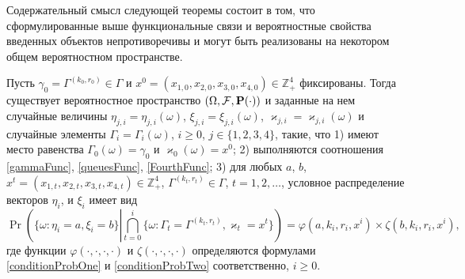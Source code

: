 \documentclass[a4paper,12pt,russian]{extarticle}
\begin{document}
Содержательный смысл следующей теоремы состоит в том, что сформулированные выше функциональные связи и вероятностные свойства введенных объектов непротиворечивы и могут быть реализованы на некотором общем вероятностном пространстве.
\begin{theorem}
Пусть $\gamma_0=\Gamma^{(k_0,r_0)}\in \Gamma$ и $x^0=(x_{1,0},x_{2,0}, x_{3,0},x_{4,0})\in \mathbb{Z}_+^4$ фиксированы.
Тогда существует вероятностное пространство $(\Omega, {\cal F}, \Pr(\cdot))$ и заданные на нем случайные величины $\eta_{j,i}=\eta_{j,i}(\omega)$, $\xi_{j,i}=\xi_{j,i}(\omega)$, 	 $\varkappa_{j,i}=\varkappa_{j,i}(\omega)$ и случайные элементы $\Gamma_i=\Gamma_i(\omega)$, $i\geqslant 0$, $j\in \{1, 2, 3, 4\}$, такие, что 1) имеют место равенства $\Gamma_0(\omega) = \gamma_0$ и $\varkappa_0(\omega)=x^0$; 2) выполняются соотношения \eqref{gammaFunc}, \eqref{queuesFunc}, \eqref{FourthFunc}; 3) для любых  $a$, $b$, $x^t=(x_{1,t},x_{2,t},x_{3,t},x_{4,t}) \in \mathbb{Z}_+^4$, $\Gamma^{(k_t,r_t)} \in \Gamma$, $t = 1, 2, \ldots$, условное распределение векторов $\eta_i$, и $\xi_i$ имеет вид
\begin{equation}
\Pr \left(\{ \omega \colon \eta_i = a, \xi_i=b\} \left|\bigcap_{t=0}^{i}\{\omega\colon \Gamma_t=\Gamma^{(k_t,r_t)}, \varkappa_t=x^t\}\right.\right)=
\varphi(a,k_i,r_i,x^i)\times \zeta(b,k_i,r_i,x^i),
\label{ProbablititiesToProve}
\end{equation}
где функции $\varphi(\cdot, \cdot, \cdot, \cdot)$ и $\zeta(\cdot, \cdot, \cdot, \cdot)$ определяются формулами \eqref{conditionProbOne} и \eqref{conditionProbTwo} соответственно, $i \geqslant 0$.

\label{myTheorem}
\end{theorem}
\end{document}
